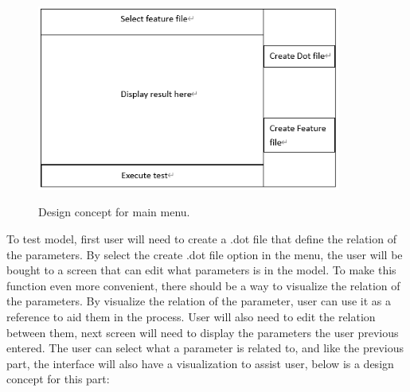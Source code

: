 \begin{figure}[H]
	\centering
	\includegraphics[width=10cm]{figures/mainMenu.png}\\
	\caption{Design concept for main menu.}
	\label{fig:figure4}
\end{figure}
To test model, first user will need to create a .dot file that define the relation of the parameters. By select the create .dot file option in the menu, the user will be bought to a screen that can edit what parameters is in the model. To make this function even more convenient, there should be a way to visualize the relation of the parameters. By visualize the relation of the parameter, user can use it as a reference to aid them in the process. User will also need to edit the relation between them, next screen will need to display the parameters the user previous entered. The user can select what a parameter is related to, and like the previous part, the interface will also have a visualization to assist user, below is a design concept for this part:

